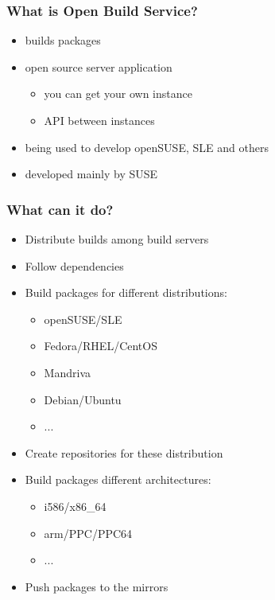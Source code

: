\begin{frame}[t]
   \frametitle{What is Open Build Service?}
   \begin{itemize}
      \item builds packages
      \item open source server application
      \begin{itemize}
         \item you can get your own instance
         \item API between instances
      \end{itemize}
      \item being used to develop openSUSE, SLE and others
      \item developed mainly by SUSE
   \end{itemize}
\end{frame}

\begin{frame}[t]
   \frametitle{What can it do?}
   \begin{itemize}
      \item Distribute builds among build servers
      \item Follow dependencies
      \item Build packages for different distributions:
      \begin{itemize}
         \item openSUSE/SLE
         \item Fedora/RHEL/CentOS
         \item Mandriva
         \item Debian/Ubuntu
         \item ...
      \end{itemize}
      \item Create repositories for these distribution
      \item Build packages different architectures:
      \begin{itemize}
         \item i586/x86\_64
         \item arm/PPC/PPC64
         \item ...
      \end{itemize}
      \item Push packages to the mirrors
   \end{itemize}
\end{frame}

